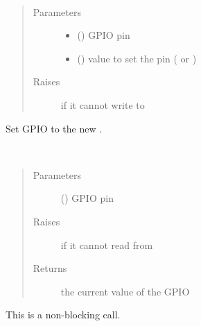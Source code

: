 \documentclass[letterpaper,10pt,english]{sphinxmanual}
\begin{document}
\begin{fulllineitems}
\label{\detokenize{index:rcpy.gpio.set}}~\begin{quote}\begin{description}
\item[{Parameters}] \leavevmode\begin{itemize}
\item {} 
 () \textendash{} GPIO pin

\item {} 
 () \textendash{} value to set the pin ({\hyperref[\detokenize{index:rcpy.gpio.HIGH}]{}} or {\hyperref[\detokenize{index:rcpy.gpio.LOW}]{}})

\end{itemize}

\item[{Raises}] \leavevmode
{} \textendash{} if it cannot write to 

\end{description}\end{quote}

Set GPIO  to the new .

\end{fulllineitems}


\begin{fulllineitems}
\label{\detokenize{index:rcpy.gpio.get}}~\begin{quote}\begin{description}
\item[{Parameters}] \leavevmode
{} () \textendash{} GPIO pin

\item[{Raises}] \leavevmode
{} \textendash{} if it cannot read from 

\item[{Returns}] \leavevmode
the current value of the GPIO 

\end{description}\end{quote}

This is a non-blocking call.

\end{fulllineitems}
\end{document}
